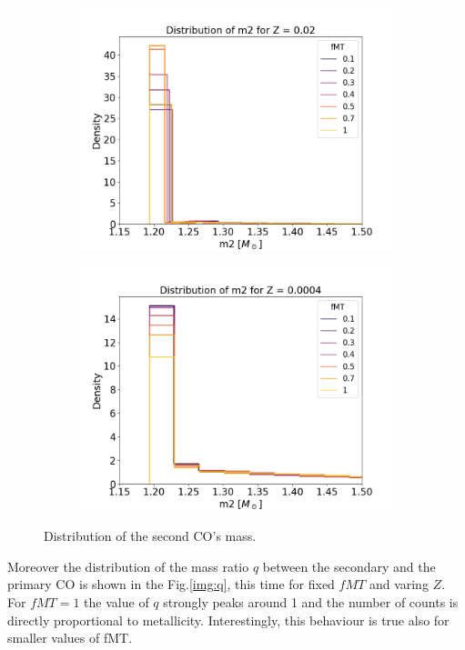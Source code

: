 \documentclass[preprint,12pt]{elsarticle}
\begin{document}
\begin{figure}[ht]
    \centering
    \begin{subfigure}[t]{0.45\textwidth}
        \centering
        \includegraphics[width=1\textwidth]{Images/m2_zoom.png}   
    \end{subfigure}
    \begin{subfigure}[t]{0.45\textwidth}
    \centering \includegraphics[width=1\textwidth]{Images/m2_zoomZ0.0004.png}
    \end{subfigure}
    \caption{Distribution of the second CO's mass.}
    \label{img:m2_zoom}
\end{figure}
Moreover the distribution of the mass ratio $q$ between the secondary and the primary CO is shown in the Fig.\ref{img:q}, this time for fixed $fMT$ and varing $Z$.
For $fMT = 1$ the value of $q$ strongly peaks around 1 and the number of counts is directly proportional to metallicity.  Interestingly, this behaviour is true also for smaller values of fMT.
\end{document}
